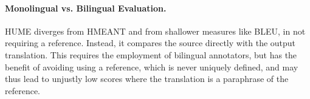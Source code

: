 \documentclass[11pt,letterpaper]{article}
\newcommand{\com}[1]{}
\newcommand{\oa}[1]{}
\newcommand{\bh}[1]{\footnote{\color{blue}BH: #1}}
\begin{document}



\paragraph{Monolingual vs. Bilingual Evaluation.}
\label{src-vs-ref}
HUME diverges from HMEANT and from shallower measures
like BLEU, in not requiring a reference.
Instead, it compares the source directly with the output translation.
This requires the employment of bilingual annotators, but has the benefit of avoiding
using a reference, which is never uniquely defined, and may thus 
lead to unjustly low scores where the translation is a paraphrase of the reference.




\com{
\paragraph{Error Localisation.}
In HMEANT, an error in a child node often results in the parent node
being penalised as well. This makes it harder to quantify the true scale of  
the original error, as its effect gets propagated up the tree. 
In HUME, errors are localised as much as possible to where they occur,
by the separation of atomic and structural units,
which supports a more accurate aggregation of the translation errors
to a composite score.
}

\end{document}
